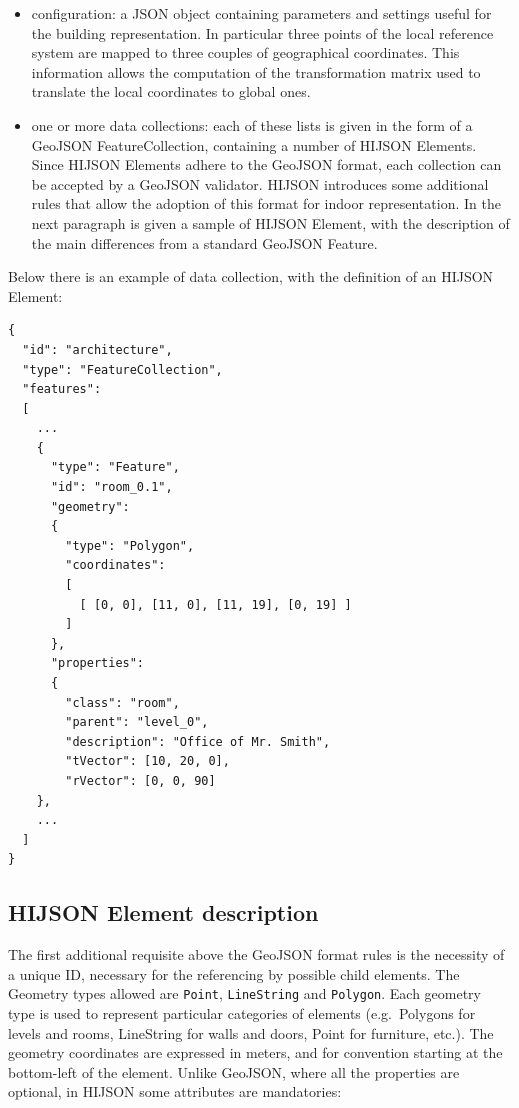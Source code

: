 \documentclass{sig-alternate}
\begin{document}
\begin{itemize}
\itemsep1pt\parskip0pt
\item  
  configuration: a JSON object containing parameters and settings useful
  for the building representation. In particular three points of the local
  reference system are mapped to three couples of geographical coordinates.
  This information allows the computation of the transformation matrix used to
  translate the local coordinates to global ones.
\item
  one or more data collections: each of these lists is given in the form   of
  a GeoJSON FeatureCollection, containing a number of HIJSON   Elements. Since
  HIJSON Elements adhere to the GeoJSON format, each   collection can be
  accepted by a GeoJSON validator. HIJSON introduces   some additional rules
  that allow the adoption of this format for   indoor representation. In the
  next paragraph is given a sample of HIJSON Element, with   the description of
  the main differences from a standard GeoJSON   Feature. 
\end{itemize}

Below there is an example of data collection, with the definition of an HIJSON Element:

\begin{verbatim}
{
  "id": "architecture",
  "type": "FeatureCollection",
  "features": 
  [
    ...
    {
      "type": "Feature",
      "id": "room_0.1",
      "geometry": 
      {
        "type": "Polygon",
        "coordinates": 
        [ 
          [ [0, 0], [11, 0], [11, 19], [0, 19] ]
        ]
      },
      "properties": 
      {
        "class": "room",
        "parent": "level_0",
        "description": "Office of Mr. Smith",
        "tVector": [10, 20, 0],
        "rVector": [0, 0, 90]
    },
    ...
  ]
}
\end{verbatim}

\subsection{HIJSON Element description}

The first additional requisite above the GeoJSON format rules is the
necessity of a unique ID, necessary for the referencing by possible
child elements. The Geometry types allowed are \texttt{Point},
\texttt{LineString} and \texttt{Polygon}. Each geometry type is used to
represent particular categories of elements (e.g.~Polygons for levels
and rooms, LineString for walls and doors, Point for furniture, etc.).
The geometry coordinates are expressed in meters, and for convention
starting at the bottom-left of the element. Unlike GeoJSON, where all
the properties are optional, in HIJSON some attributes are mandatories:
\end{document}
